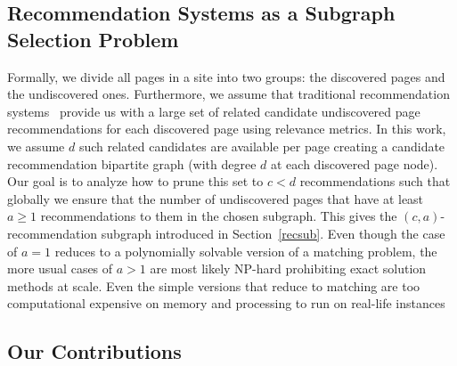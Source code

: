 \subsection{Recommendation Systems as a Subgraph Selection Problem}

Formally, we divide all pages in a site into two groups: the discovered pages and the undiscovered ones.
Furthermore, we assume that traditional recommendation systems~\cite{Schafer1999, Adomavicius2005,
  Resnick1997} provide us with a large set of related candidate undiscovered page recommendations
for each discovered page using relevance metrics. In this work, we assume $d$
such related candidates are available per page creating a candidate recommendation bipartite graph
(with degree $d$ at each discovered page node).
Our goal is to analyze how to prune this set to $c < d$ recommendations such that
globally we ensure that the number of undiscovered pages that have at least $a \geq 1$ recommendations to them in the chosen subgraph. This gives the $(c,a)$-recommendation subgraph introduced in Section~\ref{recsub}. Even though the case of $a=1$ reduces to a polynomially solvable version of a matching problem, the more usual cases of $a > 1$ are most likely NP-hard prohibiting exact solution methods at scale. Even the simple versions that reduce to matching are too computational expensive on memory and processing to run on real-life instances \vs

\subsection{Our Contributions}

